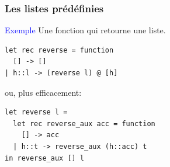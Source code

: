 %
\begin{frame}[containsverbatim]
\frametitle{Les listes prédéfinies}

\textcolor{blue}{Exemple} Une  fonction qui retourne une liste.

{\small
\begin{verbatim}
let rec reverse = function
  [] -> []
| h::l -> (reverse l) @ [h]
\end{verbatim}
}

\bigskip

ou, plus efficacement:
{\small
\begin{verbatim}
let reverse l =
  let rec reverse_aux acc = function
    [] -> acc
  | h::t -> reverse_aux (h::acc) t
in reverse_aux [] l
\end{verbatim}
}

\end{frame}
